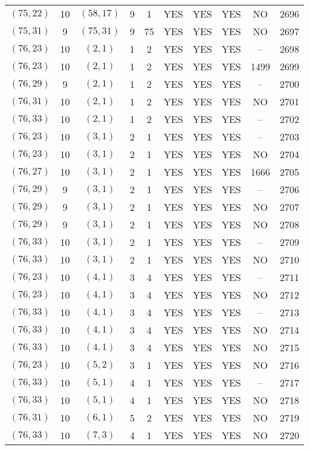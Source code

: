 \begin{longtable}{|c|c|c|c|c|c|c|c|c|c|}
$(75, 22)$ & 10 & $(58, 17)$ & 9 & 1 & YES & YES & YES & NO & 2696\\
$(75, 31)$ & 9 & $(75, 31)$ & 9 & 75 & YES & YES & YES & NO & 2697\\
$(76, 23)$ & 10 & $(2, 1)$ & 1 & 2 & YES & YES & YES & -- & 2698\\
$(76, 23)$ & 10 & $(2, 1)$ & 1 & 2 & YES & YES & YES & 1499 & 2699\\
$(76, 29)$ & 9 & $(2, 1)$ & 1 & 2 & YES & YES & YES & -- & 2700\\
$(76, 31)$ & 10 & $(2, 1)$ & 1 & 2 & YES & YES & YES & NO & 2701\\
$(76, 33)$ & 10 & $(2, 1)$ & 1 & 2 & YES & YES & YES & -- & 2702\\
$(76, 23)$ & 10 & $(3, 1)$ & 2 & 1 & YES & YES & YES & -- & 2703\\
$(76, 23)$ & 10 & $(3, 1)$ & 2 & 1 & YES & YES & YES & NO & 2704\\
$(76, 27)$ & 10 & $(3, 1)$ & 2 & 1 & YES & YES & YES & 1666 & 2705\\
$(76, 29)$ & 9 & $(3, 1)$ & 2 & 1 & YES & YES & YES & -- & 2706\\
$(76, 29)$ & 9 & $(3, 1)$ & 2 & 1 & YES & YES & YES & NO & 2707\\
$(76, 29)$ & 9 & $(3, 1)$ & 2 & 1 & YES & YES & YES & NO & 2708\\
$(76, 33)$ & 10 & $(3, 1)$ & 2 & 1 & YES & YES & YES & -- & 2709\\
$(76, 33)$ & 10 & $(3, 1)$ & 2 & 1 & YES & YES & YES & NO & 2710\\
$(76, 23)$ & 10 & $(4, 1)$ & 3 & 4 & YES & YES & YES & -- & 2711\\
$(76, 23)$ & 10 & $(4, 1)$ & 3 & 4 & YES & YES & YES & NO & 2712\\
$(76, 33)$ & 10 & $(4, 1)$ & 3 & 4 & YES & YES & YES & -- & 2713\\
$(76, 33)$ & 10 & $(4, 1)$ & 3 & 4 & YES & YES & YES & NO & 2714\\
$(76, 33)$ & 10 & $(4, 1)$ & 3 & 4 & YES & YES & YES & NO & 2715\\
$(76, 23)$ & 10 & $(5, 2)$ & 3 & 1 & YES & YES & YES & NO & 2716\\
$(76, 33)$ & 10 & $(5, 1)$ & 4 & 1 & YES & YES & YES & -- & 2717\\
$(76, 33)$ & 10 & $(5, 1)$ & 4 & 1 & YES & YES & YES & NO & 2718\\
$(76, 31)$ & 10 & $(6, 1)$ & 5 & 2 & YES & YES & YES & NO & 2719\\
$(76, 33)$ & 10 & $(7, 3)$ & 4 & 1 & YES & YES & YES & NO & 2720\\

\end{longtable}
